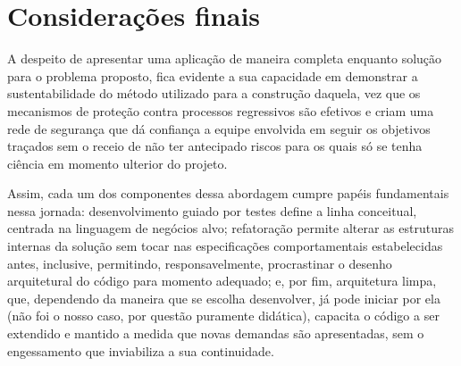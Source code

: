 \section{Considerações finais}

  A despeito de apresentar uma aplicação de maneira completa enquanto solução para o problema proposto, fica evidente a sua capacidade em demonstrar a sustentabilidade do método utilizado para a construção daquela, vez que os mecanismos de proteção contra processos regressivos são efetivos e criam uma rede de segurança que dá confiança a equipe envolvida em seguir os objetivos traçados sem o receio de não ter antecipado riscos para os quais só se tenha ciência em momento ulterior do projeto.

  Assim, cada um dos componentes dessa abordagem cumpre papéis fundamentais nessa jornada: desenvolvimento guiado por testes define a linha conceitual, centrada na linguagem de negócios alvo; refatoração permite alterar as estruturas internas da solução sem tocar nas especificações comportamentais estabelecidas antes, inclusive, permitindo, responsavelmente, procrastinar o desenho arquitetural do código para momento adequado; e, por fim, arquitetura limpa, que, dependendo da maneira que se escolha desenvolver, já pode iniciar por ela (não foi o nosso caso, por questão puramente didática), capacita o código a ser extendido e mantido a medida que novas demandas são apresentadas, sem o engessamento que inviabiliza a sua continuidade.
